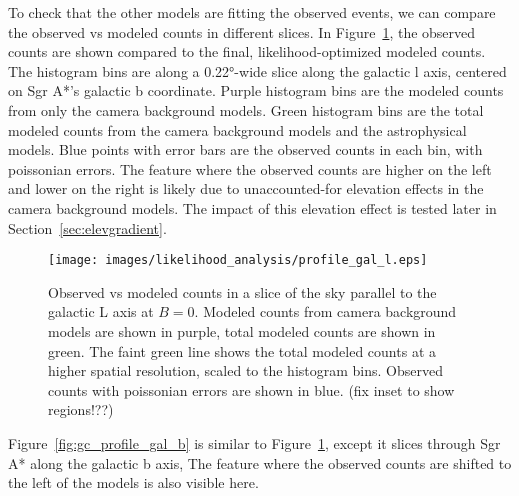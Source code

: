   To check that the other models are fitting the observed events, we can compare the observed vs modeled counts in different slices.
  In Figure~\ref{fig:gc_profile_gal_l}, the observed counts are shown compared to the final, likelihood-optimized modeled counts.
  The histogram bins are along a \ang{0.22}-wide slice along the galactic l axis, centered on Sgr A*'s galactic b coordinate.
  Purple histogram bins are the modeled counts from only the camera background models.
  Green histogram bins are the total modeled counts from the camera background models and the astrophysical models.
  Blue points with error bars are the observed counts in each bin, with poissonian errors.
  The feature where the observed counts are higher on the left and lower on the right is likely due to unaccounted-for elevation effects in the camera background models.
  The impact of this elevation effect is tested later in Section~\ref{sec:elevgradient}.
  
  \begin{figure}[h]
    \centering
    \texttt{[image: images/likelihood\_analysis/profile\_gal\_l.eps]}
    \caption[Galactic Center Profile vs Galactic L]{
      Observed vs modeled counts in a slice of the sky parallel to the galactic L axis at $B=0$.
      Modeled counts from camera background models are shown in purple, total modeled counts are shown in green.
      The faint green line shows the total modeled counts at a higher spatial resolution, scaled to the histogram bins.
      Observed counts with poissonian errors are shown in blue.
      {\color{red}(fix inset to show regions!??)}
    }
    \label{fig:gc_profile_gal_l}
  \end{figure}

  Figure~\ref{fig:gc_profile_gal_b} is similar to Figure~\ref{fig:gc_profile_gal_l}, except it slices through Sgr A* along the galactic b axis,
  The feature where the observed counts are shifted to the left of the models is also visible here.

